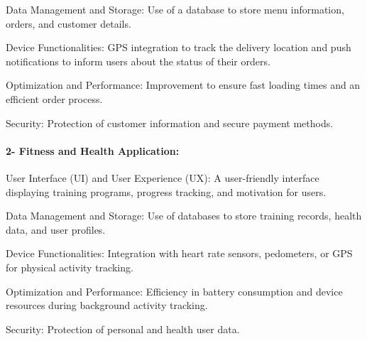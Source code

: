 \documentclass{article}
\begin{document}
Data Management and Storage: Use of a database to store menu information, orders, and customer details.

Device Functionalities: GPS integration to track the delivery location and push notifications to inform users about the status of their orders.

Optimization and Performance: Improvement to ensure fast loading times and an efficient order process.

Security: Protection of customer information and secure payment methods.

\paragraph{2- Fitness and Health Application:}
User Interface (UI) and User Experience (UX): A user-friendly interface displaying training programs, progress tracking, and motivation for users.

Data Management and Storage: Use of databases to store training records, health data, and user profiles.

Device Functionalities: Integration with heart rate sensors, pedometers, or GPS for physical activity tracking.

Optimization and Performance: Efficiency in battery consumption and device resources during background activity tracking.

Security: Protection of personal and health user data.
\end{document}
